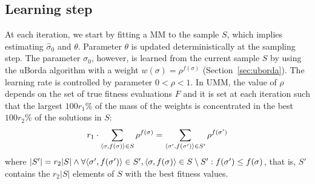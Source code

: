 \documentclass[sigconf,dvipsnames]{acmart}
\begin{document}
\subsection{Learning step}
%
At each iteration, we start by fitting a MM to the sample $S$, which implies
estimating $\hat\sigma_0$ and $\theta$. Parameter $\theta$ is updated
deterministically at the sampling step.  The parameter $\sigma_0$, however, is
learned from the current sample $S$ by using the uBorda algorithm with a weight
$w(\sigma)=\rho^{f(\sigma)}$ (Section~\ref{sec:uborda}). The learning rate is
controlled by parameter $0 < \rho < 1$. 
In UMM, the value of $\rho$ depends on the set of true fitness evaluations $F$
and it is set at each iteration such that the largest $100r_1$\% of the mass of
the weights is concentrated in the best $100r_2$\% of the solutions in $S$:
%
% 
\begin{equation}
    r_1 \cdot \sum_{\tuple{\sigma,f(\sigma)}\in S}\rho^{f(\sigma)} =  \sum_{\tuple{\sigma', f(\sigma')}\in S'}\rho^{f(\sigma')}  %
\end{equation}
%
where $|S'| = r_2|S| \land \forall \langle \sigma',f(\sigma')\rangle\in S', \langle \sigma,f(\sigma)\rangle\in S\setminus S' : f(\sigma')\leq f(\sigma)$, that is, $S'$ contains the $r_2|S|$ elements of $S$ with the best  fitness values. %
\end{document}
